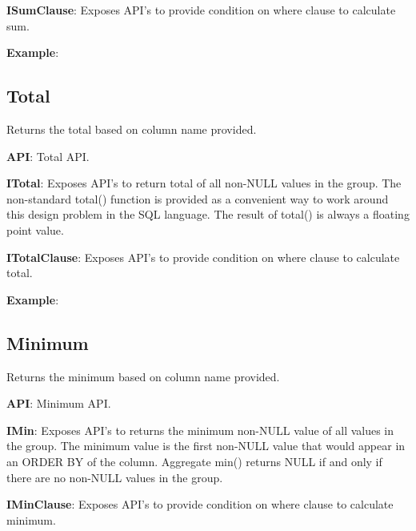 			
			\textbf{ISumClause}: Exposes API's to provide condition on where clause to calculate sum.
				

			\textbf{Example}: 
				


	\subsection{Total} 
		\par 
		Returns the total based on column name provided.

			\textbf{API}: Total API.
				
		
			\textbf{ITotal}:     Exposes API's to return total of all non-NULL values in the group.
 						The non-standard total() function is provided as a convenient way to work around this design problem in the SQL language.
						The result of total() is always a floating point value.


				

			
			\textbf{ITotalClause}: Exposes API's to provide condition on where clause to calculate total.
				

			\textbf{Example}: 
				


	\subsection{Minimum} 
		\par 
		Returns the minimum based on column name provided.

			\textbf{API}: Minimum API.
				
		
			\textbf{IMin}:      Exposes API's to returns the minimum non-NULL value of all values in the group.
						The minimum value is the first non-NULL value that would appear in an ORDER BY of the column.
						Aggregate min() returns NULL if and only if there are no non-NULL values in the group.


				

			
			\textbf{IMinClause}: Exposes API's to provide condition on where clause to calculate minimum.
				

